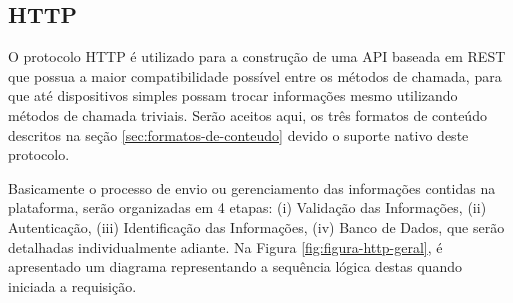         \subsection{HTTP}
        \label{sec:aquisicao-http}
        O protocolo \gls{HTTP} é utilizado para a construção de uma \gls{API} baseada em \gls{REST} que possua a maior compatibilidade possível entre os métodos de chamada, para que até dispositivos simples possam trocar informações mesmo utilizando métodos de chamada triviais. Serão aceitos aqui, os três formatos de conteúdo descritos na seção \ref{sec:formatos-de-conteudo} devido o suporte nativo deste protocolo.
        
        Basicamente o processo de envio ou gerenciamento das informações contidas na plataforma, serão organizadas em 4 etapas: (i) Validação das Informações, (ii) Autenticação, (iii) Identificação das Informações, (iv) Banco de Dados, que serão detalhadas individualmente adiante. Na Figura \ref{fig:figura-http-geral}, é apresentado um diagrama representando a sequência lógica destas quando iniciada a requisição.
        
        \begin{figure}[!h]
    	\end{figure}
    	
    	\begin{figure}[!h]
    	\end{figure}
    	
